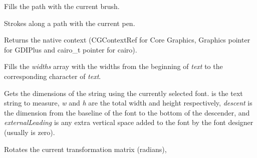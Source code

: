 
Fills the path with the current brush.

\label{wxgraphicscontextstrokepath}


Strokes along a path with the current pen.


\label{wxgraphicscontextgetnativecontext}


Returns the native context (CGContextRef for Core Graphics, Graphics pointer for GDIPlus and cairo\_t pointer for cairo).

\label{wxgraphicscontextgetpartialtextextents}


Fills the {\it widths} array with the widths from the beginning of 
{\it text} to the corresponding character of {\it text}.  

\label{wxgraphicscontextgettextextent}


Gets the dimensions of the string using the currently selected font.
 is the text string to measure, {\it w} and {\it h} are
the total width and height respectively, {\it descent} is the
dimension from the baseline of the font to the bottom of the
descender, and {\it externalLeading} is any extra vertical space added
to the font by the font designer (usually is zero).

\label{wxgraphicscontextrotate}


Rotates the current transformation matrix (radians),

\label{wxgraphicscontextscale}


